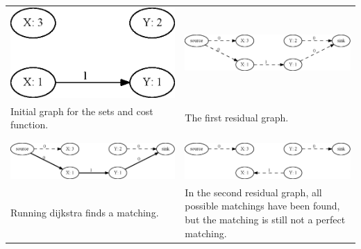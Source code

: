 \documentclass[11pt]{article}
\begin{document}
\begingroup
    \fontsize{7pt}{10pt}\selectfont
\begin{tabular}{ p{5.5cm} | p{5.5cm} }
   \centerline{\includegraphics[scale=0.3]{drawings/eps/TwoWayCostMatchingNotPerfect/1it0.eps}} &
    \centerline{\includegraphics[scale=0.3]{drawings/eps/TwoWayCostMatchingNotPerfect/1it1.eps}} \\
   Initial graph for the sets and cost function. &
    The first residual graph. \\ \\ \hline \\

    \centerline{\includegraphics[scale=0.3]{drawings/eps/TwoWayCostMatchingNotPerfect/1it2.eps}} &
    \centerline{\includegraphics[scale=0.3]{drawings/eps/TwoWayCostMatchingNotPerfect/1it3.eps}} \\
   Running dijkstra finds a matching. &
   In the second residual graph, all possible matchings have been found, but the matching is still not a perfect matching. \\ 
\end{tabular}
\end{document}
